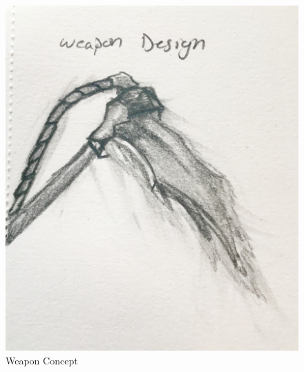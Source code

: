 \documentclass[12pt,titlepage]{article}
\begin{document}
\begin{figure}[H]
    \caption{Weapon Concept}
    \label{fig:weapon_concept}
    \centering
    \includegraphics[width=0.35\textheight]{../../graphics/scythe}
\end{figure}
\end{document}
